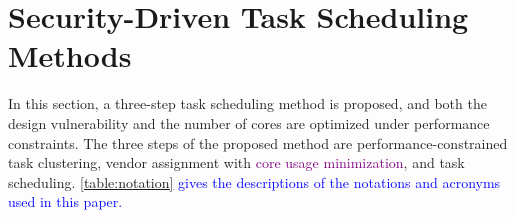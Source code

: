 \documentclass[10pt,journal, compsoc]{IEEEtran}
\begin{document}


















\section{Security-Driven Task Scheduling Methods}

In this section, a three-step task scheduling method is proposed, and both the design vulnerability and the number of cores are optimized under performance constraints. The three steps of the proposed method are performance-constrained task clustering, vendor assignment with \textcolor{purple}{core usage minimization}, and task scheduling. \textcolor{blue}{\cref{table:notation} gives the descriptions of the notations and acronyms used in this paper.}
\end{document}
